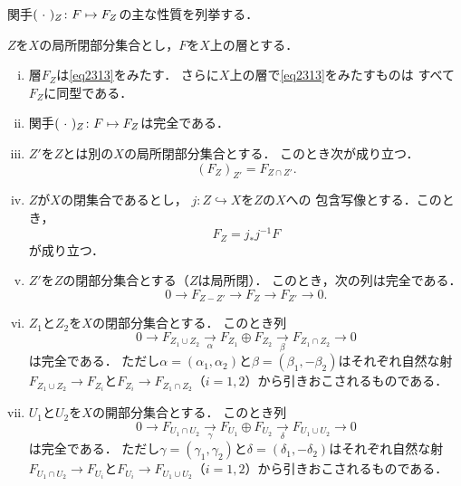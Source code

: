 関手\((\mathord{\ \cdot\ })_Z\colon F\mapsto F_Z\)の主な性質を列挙する．
\begin{leftbar}
\begin{PRP}\label{PRP236}
    \(Z\)を\(X\)の局所閉部分集合とし，\(F\)を\(X\)上の層とする．
    \begin{enumerate}[(i)]
        \item 層\(F_Z\)は\eqref{eq2313}をみたす．
        さらに\(X\)上の層で\eqref{eq2313}をみたすものは
        すべて\(F_Z\)に同型である．
        \item 関手\((\mathord{\ \cdot\ })_Z\colon F\mapsto F_Z\)は完全である．
        \item \(Z'\)を\(Z\)とは別の\(X\)の局所閉部分集合とする．
        このとき次が成り立つ．\[
            \left(F_Z\right)_{Z'}=F_{Z\cap Z'}.
        \]
        \item \(Z\)が\(X\)の閉集合であるとし，
        \(j\colon Z\hookrightarrow X\)を\(Z\)の\(X\)への
        包含写像とする．このとき，\[F_Z=j_{\ast}j^{-1}F\]が成り立つ．
        \item \(Z'\)を\(Z\)の閉部分集合とする（\(Z\)は局所閉）．
        このとき，次の列は完全である．\[
            0\to F_{Z-Z'}\to F_Z\to F_{Z'}\to 0.
        \]
        \item \(Z_1\)と\(Z_2\)を\(X\)の閉部分集合とする．
        このとき列\[
            0\to F_{Z_1\cup Z_2}\underset{\alpha}{\to}
            F_{Z_1}\oplus F_{Z_2}\underset{\beta}{\to}
            F_{Z_1\cap Z_2}\to0
        \]は完全である．
        ただし\(\alpha=\left(\alpha_1,\alpha_2\right)\)と\(
            \beta=\left(\beta_1,-\beta_2\right)
        \)はそれぞれ自然な射\(F_{Z_1\cup Z_2}\to F_{Z_i}\)と\(
            F_{Z_i}\to F_{Z_1\cap Z_2}
        \)（\(i=1,2\)）から引きおこされるものである．
        \item \(U_1\)と\(U_2\)を\(X\)の開部分集合とする．
        このとき列\[
            0\to F_{U_1\cap U_2}\underset{\gamma}{\to}
            F_{U_1}\oplus F_{U_2}\underset{\delta}{\to}
            F_{U_1\cup U_2}\to0
        \]は完全である．
        ただし\(\gamma=\left(\gamma_1,\gamma_2\right)\)と\(
            \delta=\left(\delta_1,-\delta_2\right)
        \)はそれぞれ自然な射\(F_{U_1\cap U_2}\to F_{U_i}\)と\(
            F_{U_i}\to F_{U_1\cup U_2}
        \)（\(i=1,2\)）から引きおこされるものである．
    \end{enumerate}
\end{PRP}
\end{leftbar}
